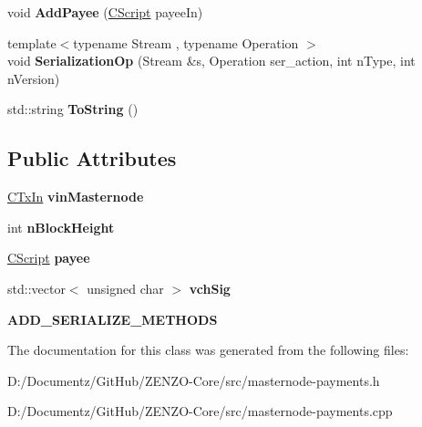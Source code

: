 \begin{DoxyCompactItemize}
void {\bfseries Add\+Payee} (\mbox{\hyperlink{class_c_script}{C\+Script}} payee\+In)
\item 
\mbox{\label{class_c_masternode_payment_winner_aa533f72a1a4fcee2b3d061d4e8b03bf6}} 
{\footnotesize template$<$typename Stream , typename Operation $>$ }\\void {\bfseries Serialization\+Op} (Stream \&s, Operation ser\+\_\+action, int n\+Type, int n\+Version)
\item 
\mbox{\label{class_c_masternode_payment_winner_a188f4b487f9481bdcc6d5b052793512e}} 
std\+::string {\bfseries To\+String} ()
\end{DoxyCompactItemize}
\subsection*{Public Attributes}
\begin{DoxyCompactItemize}
\item 
\mbox{\label{class_c_masternode_payment_winner_ab3242857185f9dbd6d38faeb31fdbe58}} 
\mbox{\hyperlink{class_c_tx_in}{C\+Tx\+In}} {\bfseries vin\+Masternode}
\item 
\mbox{\label{class_c_masternode_payment_winner_ae220dc7e74441f319751c24760ea670e}} 
int {\bfseries n\+Block\+Height}
\item 
\mbox{\label{class_c_masternode_payment_winner_a06110371aa9d82a6dbde904335cbfc5a}} 
\mbox{\hyperlink{class_c_script}{C\+Script}} {\bfseries payee}
\item 
\mbox{\label{class_c_masternode_payment_winner_a35844d9486f2c41ebf949e13d595247d}} 
std\+::vector$<$ unsigned char $>$ {\bfseries vch\+Sig}
\item 
\mbox{\label{class_c_masternode_payment_winner_a9617f0ec9ed362ef9035235574fb1d4d}} 
{\bfseries A\+D\+D\+\_\+\+S\+E\+R\+I\+A\+L\+I\+Z\+E\+\_\+\+M\+E\+T\+H\+O\+DS}
\end{DoxyCompactItemize}


The documentation for this class was generated from the following files\+:\begin{DoxyCompactItemize}
\item 
D\+:/\+Documentz/\+Git\+Hub/\+Z\+E\+N\+Z\+O-\/\+Core/src/masternode-\/payments.\+h\item 
D\+:/\+Documentz/\+Git\+Hub/\+Z\+E\+N\+Z\+O-\/\+Core/src/masternode-\/payments.\+cpp\end{DoxyCompactItemize}
